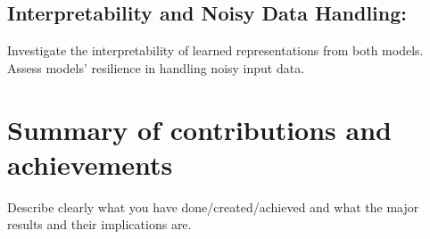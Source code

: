 \subsection{Interpretability and Noisy Data Handling:}
Investigate the interpretability of learned representations from both models.
Assess models' resilience in handling noisy input data.

\section{Summary of contributions and achievements} %
\label{sec:intro_sum_results} %
Describe clearly what you have done/created/achieved and what the major results and their implications are. 



